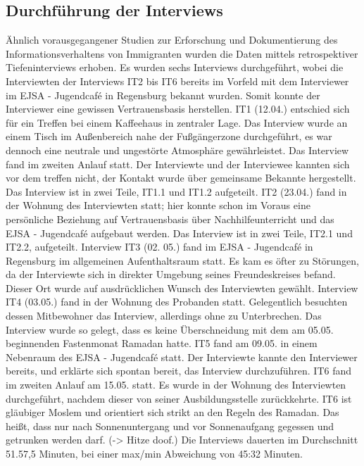 \subsection{Durchführung der Interviews}

Ähnlich vorausgegangener Studien zur Erforschung und Dokumentierung des Informationsverhaltens von Immigranten \cite{courtright2005health}\cite{oduntan2017investigating}\cite{mykyttschak2018}\cite{lingel2011information}\cite{shoham2008immigrants} wurden die Daten mittels retrospektiver Tiefeninterviews erhoben. Es wurden sechs Interviews durchgeführt, wobei die Interviewten der Interviews IT2 bis IT6 bereits im Vorfeld mit dem Interviewer im EJSA - Jugendcafé in Regensburg bekannt wurden. Somit konnte der Interviewer eine gewissen Vertrauensbasis herstellen.\newline
IT1 (12.04.) entschied sich für ein Treffen bei einem Kaffeehaus in zentraler Lage. Das Interview wurde an einem Tisch im Außenbereich nahe der Fußgängerzone durchgeführt, es war dennoch eine neutrale und ungestörte Atmosphäre gewährleistet. Das Interview fand im zweiten Anlauf statt. Der Interviewte und der Interviewee kannten sich vor dem treffen nicht, der Kontakt wurde über gemeinsame Bekannte hergestellt. Das Interview ist in zwei Teile, IT1.1 und IT1.2 aufgeteilt.\newline
IT2 (23.04.) fand in der Wohnung des Interviewten statt; hier konnte schon im Voraus eine persönliche Beziehung auf Vertrauensbasis über Nachhilfeunterricht und das EJSA - Jugendcafé aufgebaut werden. Das Interview ist in zwei Teile, IT2.1 und IT2.2, aufgeteilt.\newline
Interview IT3 (02. 05.) fand im EJSA - Jugendcafé in Regensburg im allgemeinen Aufenthaltsraum statt. Es kam es öfter zu Störungen, da der Interviewte sich in direkter Umgebung seines Freundeskreises befand. Dieser Ort wurde auf ausdrücklichen Wunsch des Interviewten gewählt.\newline
Interview IT4 (03.05.) fand in der Wohnung des Probanden statt. Gelegentlich besuchten dessen Mitbewohner das Interview, allerdings ohne zu Unterbrechen. Das Interview wurde so gelegt, dass es keine Überschneidung mit dem am 05.05. beginnenden Fastenmonat Ramadan hatte.\newline
IT5 fand am 09.05. in einem Nebenraum des EJSA - Jugendcafé statt. Der Interviewte kannte den Interviewer bereits, und erklärte sich spontan bereit, das Interview durchzuführen.
IT6 fand im zweiten Anlauf am 15.05. statt. Es wurde in der Wohnung des Interviewten durchgeführt, nachdem dieser von seiner Ausbildungsstelle zurückkehrte. IT6 ist gläubiger Moslem und orientiert sich strikt an den Regeln des Ramadan. Das heißt, dass nur nach Sonnenuntergang und vor Sonnenaufgang gegessen und getrunken werden darf. (-> Hitze doof.)\newline
Die Interviews dauerten im Durchschnitt 51.57,5 Minuten, bei einer max/min Abweichung von 45:32 Minuten.

